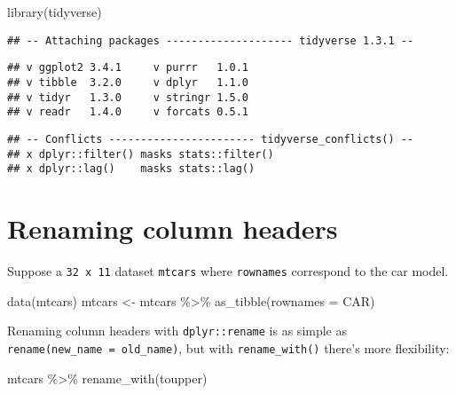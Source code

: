 \documentclass[
]{book}
\newenvironment{Shaded}{\begin{snugshade}}{\end{snugshade}}
\newcommand{\AttributeTok}[1]{\textcolor[rgb]{0.77,0.63,0.00}{#1}}
\newcommand{\FunctionTok}[1]{\textcolor[rgb]{0.00,0.00,0.00}{#1}}
\newcommand{\NormalTok}[1]{#1}
\newcommand{\OtherTok}[1]{\textcolor[rgb]{0.56,0.35,0.01}{#1}}
\newcommand{\SpecialCharTok}[1]{\textcolor[rgb]{0.00,0.00,0.00}{#1}}
\newcommand{\StringTok}[1]{\textcolor[rgb]{0.31,0.60,0.02}{#1}}
\begin{document}
\begin{Shaded}
\begin{Highlighting}[]
\FunctionTok{library}\NormalTok{(tidyverse)}
\end{Highlighting}
\end{Shaded}

\begin{verbatim}
## -- Attaching packages -------------------- tidyverse 1.3.1 --
\end{verbatim}

\begin{verbatim}
## v ggplot2 3.4.1     v purrr   1.0.1
## v tibble  3.2.0     v dplyr   1.1.0
## v tidyr   1.3.0     v stringr 1.5.0
## v readr   1.4.0     v forcats 0.5.1
\end{verbatim}

\begin{verbatim}
## -- Conflicts ----------------------- tidyverse_conflicts() --
## x dplyr::filter() masks stats::filter()
## x dplyr::lag()    masks stats::lag()
\end{verbatim}

\hypertarget{renaming-column-headers}{%
\section{Renaming column headers}\label{renaming-column-headers}}

Suppose a \texttt{32\ x\ 11} dataset \texttt{mtcars} where \texttt{rownames} correspond to the car model.

\begin{Shaded}
\begin{Highlighting}[]
\FunctionTok{data}\NormalTok{(mtcars)}
\NormalTok{mtcars }\OtherTok{\textless{}{-}}\NormalTok{ mtcars }\SpecialCharTok{\%\textgreater{}\%} \FunctionTok{as\_tibble}\NormalTok{(}\AttributeTok{rownames =} \StringTok{\textquotesingle{}CAR\textquotesingle{}}\NormalTok{)}
\end{Highlighting}
\end{Shaded}

Renaming column headers with \texttt{dplyr::rename} is as simple as \texttt{rename(new\_name\ =\ old\_name)}, but with \texttt{rename\_with()} there's more flexibility:

\begin{Shaded}
\begin{Highlighting}[]
\NormalTok{mtcars }\SpecialCharTok{\%\textgreater{}\%} \FunctionTok{rename\_with}\NormalTok{(toupper)}
\end{Highlighting}
\end{Shaded}
\end{document}

